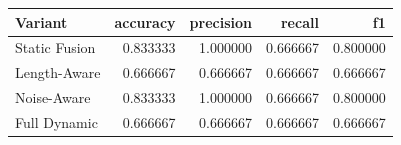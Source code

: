 \begin{tabular}{lrrrr}
\toprule
Variant & accuracy & precision & recall & f1 \\
\midrule
Static Fusion & 0.833333 & 1.000000 & 0.666667 & 0.800000 \\
Length-Aware & 0.666667 & 0.666667 & 0.666667 & 0.666667 \\
Noise-Aware & 0.833333 & 1.000000 & 0.666667 & 0.800000 \\
Full Dynamic & 0.666667 & 0.666667 & 0.666667 & 0.666667 \\
\bottomrule
\end{tabular}
